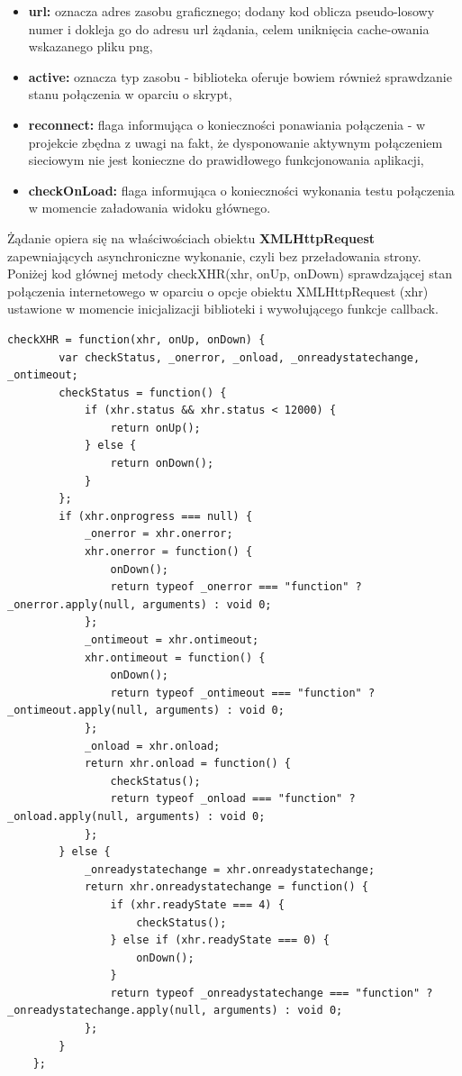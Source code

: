 \begin{itemize}
\item \textbf{url:} oznacza adres zasobu graficznego; dodany kod oblicza pseudo-losowy numer i dokleja go do adresu url żądania, celem uniknięcia cache-owania wskazanego pliku png,
\item \textbf{active:} oznacza typ zasobu - biblioteka oferuje bowiem również sprawdzanie stanu połączenia w oparciu o skrypt,
\item \textbf{reconnect:} flaga informująca o konieczności ponawiania połączenia - w projekcie zbędna z uwagi na fakt, że dysponowanie aktywnym połączeniem sieciowym nie jest konieczne do prawidłowego funkcjonowania aplikacji,
\item \textbf{checkOnLoad:} flaga informująca o konieczności wykonania testu połączenia w momencie załadowania widoku głównego.
\end{itemize}

Żądanie opiera się na właściwościach obiektu \textbf{XMLHttpRequest} zapewniających asynchroniczne wykonanie, czyli bez przeładowania strony. Poniżej kod głównej metody checkXHR(xhr, onUp, onDown) sprawdzającej stan połączenia internetowego w oparciu o opcje obiektu XMLHttpRequest (xhr) ustawione w momencie inicjalizacji biblioteki i wywołującego funkcje callback.

\begin{lstlisting}[caption=Metoda checkXHR() wykonująca żądanie AJAX załadowania zasobu graficznego., label=amb, captionpos=b]
	checkXHR = function(xhr, onUp, onDown) {
        var checkStatus, _onerror, _onload, _onreadystatechange, _ontimeout;
        checkStatus = function() {
            if (xhr.status && xhr.status < 12000) {
                return onUp();
            } else {
                return onDown();
            }
        };
        if (xhr.onprogress === null) {
            _onerror = xhr.onerror;
            xhr.onerror = function() {
                onDown();
                return typeof _onerror === "function" ? _onerror.apply(null, arguments) : void 0;
            };
            _ontimeout = xhr.ontimeout;
            xhr.ontimeout = function() {
                onDown();
                return typeof _ontimeout === "function" ? _ontimeout.apply(null, arguments) : void 0;
            };
            _onload = xhr.onload;
            return xhr.onload = function() {
                checkStatus();
                return typeof _onload === "function" ? _onload.apply(null, arguments) : void 0;
            };
        } else {
            _onreadystatechange = xhr.onreadystatechange;
            return xhr.onreadystatechange = function() {
                if (xhr.readyState === 4) {
                    checkStatus();
                } else if (xhr.readyState === 0) {
                    onDown();
                }
                return typeof _onreadystatechange === "function" ? _onreadystatechange.apply(null, arguments) : void 0;
            };
        }
    };
\end{lstlisting}

